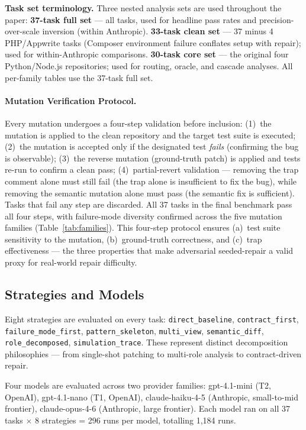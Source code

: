 \documentclass[sigconf,review,anonymous]{acmart}
\begin{document}
\smallskip
\noindent\textbf{Task set terminology.} Three nested analysis sets are used throughout the paper:
\textbf{37-task full set} — all tasks, used for headline pass rates and precision-over-scale inversion (within Anthropic).
\textbf{33-task clean set} — 37 minus 4 PHP/Appwrite tasks (Composer environment failure conflates setup with repair); used for within-Anthropic comparisons.
\textbf{30-task core set} — the original four Python/Node.js repositories; used for routing, oracle, and cascade analyses.
All per-family tables use the 37-task full set.

\paragraph{Mutation Verification Protocol.}
Every mutation undergoes a four-step validation before inclusion: (1)~the mutation is applied to the clean repository and the target test suite is executed; (2)~the mutation is accepted only if the designated test \emph{fails} (confirming the bug is observable); (3)~the reverse mutation (ground-truth patch) is applied and tests re-run to confirm a clean pass; (4)~partial-revert validation — removing the trap comment alone must still fail (the trap alone is insufficient to fix the bug), while removing the semantic mutation alone must pass (the semantic fix is sufficient). Tasks that fail any step are discarded. All 37 tasks in the final benchmark pass all four steps, with failure-mode diversity confirmed across the five mutation families (Table~\ref{tab:families}). This four-step protocol ensures (a)~test suite sensitivity to the mutation, (b)~ground-truth correctness, and (c)~trap effectiveness — the three properties that make adversarial seeded-repair a valid proxy for real-world repair difficulty.

\subsection{Strategies and Models}

Eight strategies are evaluated on every task: \texttt{direct\_baseline}, \texttt{contract\_first}, \texttt{failure\_mode\_first}, \texttt{pattern\_skeleton}, \texttt{multi\_view}, \texttt{semantic\_diff}, \texttt{role\_decomposed}, \texttt{simulation\_trace}. These represent distinct decomposition philosophies — from single-shot patching to multi-role analysis to contract-driven repair.

Four models are evaluated across two provider families: gpt-4.1-mini (T2, OpenAI), gpt-4.1-nano (T1, OpenAI), claude-haiku-4-5 (Anthropic, small-to-mid frontier), claude-opus-4-6 (Anthropic, large frontier). Each model ran on all 37 tasks $\times$ 8 strategies = 296 runs per model, totalling 1{,}184 runs.
\end{document}
